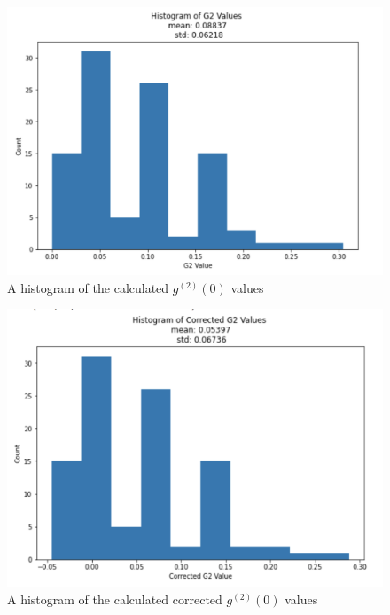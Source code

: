\documentclass[twocolumn,amsmath,amssymb,pra]{revtex4-2}
\begin{document}
\begin{figure}
    \centering
    \includegraphics[width = 0.95\linewidth]{hist_g2.png}
    \caption{A histogram of the calculated $g^{(2)}(0)$ values }
    \label{fig:g2_hist}
\end{figure}

\begin{figure}
    \centering
    \includegraphics[width = 0.95\linewidth]{hist_g2_corrected.png}
    \caption{A histogram of the calculated corrected $g^{(2)}(0)$ values}
    \label{fig:g2_hist_cor}
\end{figure}
\end{document}
